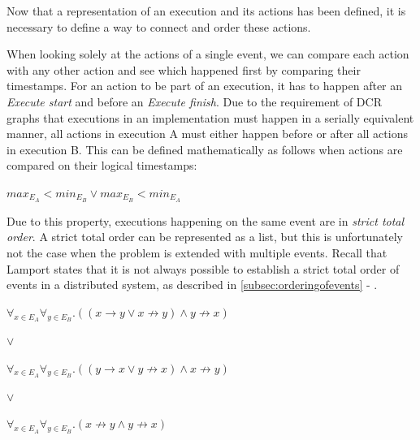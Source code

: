 	\newpar Now that a representation of an execution and its actions has been defined, it is necessary to define a way to connect and order these actions.
    
    \newpar When looking solely at the actions of a single event, we can compare each action with any other action and see which happened first by comparing their timestamps. For an action to be part of an execution, it has to happen after an \textit{Execute start} and before an \textit{Execute finish}. Due to the requirement of DCR graphs that executions in an implementation must happen in a serially equivalent manner, all actions in execution A must either happen before or after all actions in execution B. This can be defined mathematically as follows when actions are compared on their logical timestamps:
	

	\begin{center}
		$max_{E_A} < min_{E_B} \lor max_{E_B} < min_{E_A}$
	\end{center}
    
	\newpar Due to this property, executions happening on the same event are in  \textit{strict total order}. A strict total order can be represented as a list, but this is unfortunately not the case when the problem is extended with multiple events. Recall that Lamport states that it is not always possible to establish a strict total order of events in a distributed system, as described in \autoref{subsec:orderingofevents} - .
	
    \begin{center}
    	\label{math:distributedExecutionOrder}
		$\forall_{x \in E_A}\forall_{y \in E_B} . ((x \rightarrow y \lor x \not\rightarrow y) \land y \not\rightarrow x)$
        
        $\lor$
        
        $\forall_{x \in E_A}\forall_{y \in E_B} . ((y \rightarrow x \lor y \not\rightarrow x) \land x \not\rightarrow y)$
        
        $\lor$
        
        $\forall_{x \in E_A}\forall_{y \in E_B} . (x \not\rightarrow y \land y \not\rightarrow x)$
	\end{center}
    
